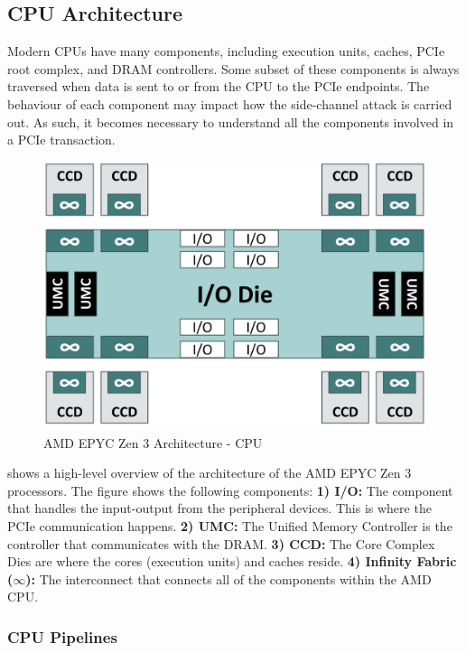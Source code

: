 \subsection{CPU Architecture}
\label{subsec:interconnect-sc-background-cpu-arch}

Modern CPUs have many components, including execution units, caches, PCIe root complex, and DRAM controllers.
Some subset of these components is always traversed when data is sent to or from the CPU to the PCIe endpoints.
The behaviour of each component may impact how the side-channel attack is carried out.
As such, it becomes necessary to understand all the components involved in a PCIe transaction.

\begin{figure}[!htb]
    \centering
    \includegraphics[width=\columnwidth]{figures/interconnect-sc/amd_arch/processor.png}
    \caption{AMD EPYC Zen 3 Architecture - CPU}
    \label{fig:amd-cpu}
\end{figure}


 shows a high-level overview of the architecture of the AMD EPYC Zen 3 processors.
The figure shows the following components:
\textbf{1) I/O:} The component that handles the input-output from the peripheral devices. This is where the PCIe communication happens.
\textbf{2) UMC:} The Unified Memory Controller is the controller that communicates with the DRAM.
\textbf{3) CCD:} The Core Complex Dies are where the cores (execution units) and caches reside.
\textbf{4) Infinity Fabric ($\infty$):} The interconnect that connects all of the components within the AMD CPU.

\subsubsection{CPU Pipelines}
\label{subsubsec:interconnect-sc-background-cpu-arch-pipelines}

